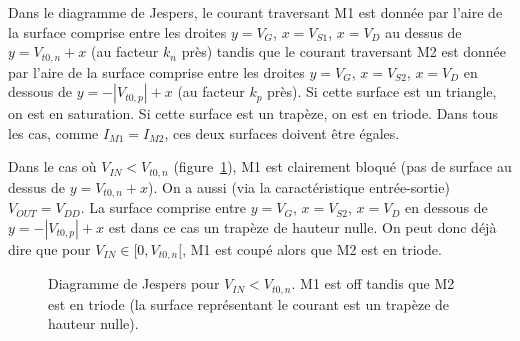 \documentclass[frenchb,DIV=14]{scrartcl}
\begin{document}
Dans le diagramme de Jespers, le courant traversant M1 est donnée par l'aire de la
surface comprise entre les droites $y = V_G$, $x = V_{S1}$, $x = V_D$ au dessus de 
$y=V_{t0,n}+x$ (au facteur $k_n$ près) tandis que le courant traversant M2 est donnée par
l'aire de la surface comprise entre les droites $y = V_G$, $x = V_{S2}$, $x = V_D$ en
dessous de $y=-|V_{t0,p}|+x$ (au facteur $k_p$ près). Si cette surface est un triangle, on est
en saturation. Si cette surface est un trapèze, on est en triode. Dans tous les cas,
comme $I_{M1} = I_{M2}$, ces deux surfaces doivent être égales.

Dans le cas où $V_{IN} < V_{t0,n}$ (figure~\ref{fig:jsp1}), M1 est clairement bloqué (pas de
surface au dessus de $y=V_{t0,n}+x$). On a aussi (via la caractéristique entrée-sortie)
$V_{OUT} = V_{DD}$. La surface comprise entre $y = V_G$, $x = V_{S2}$, $x = V_D$
en dessous de $y=-|V_{t0,p}|+x$  est dans ce cas un trapèze de hauteur nulle.
On peut donc déjà dire que pour $V_{IN} \in [0, V_{t0,n}[$, M1 est coupé alors que
M2 est en triode.

\begin{figure}[ht]
	\centering
	\caption{Diagramme de Jespers pour $V_{IN} < V_{t0,n}$. M1 est off tandis que M2
	est en triode (la surface représentant le courant est un trapèze de hauteur nulle).}
	\label{fig:jsp1}
\end{figure}
\end{document}
